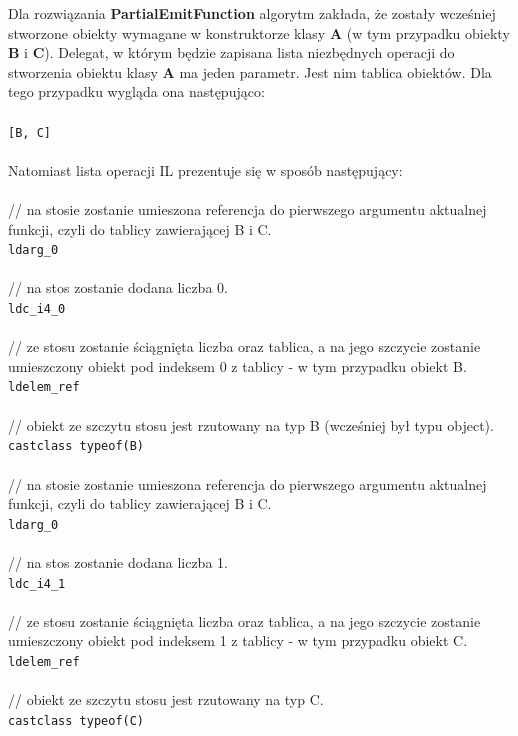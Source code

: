 \documentclass[12pt]{article}
\begin{document}
Dla rozwiązania \textbf{PartialEmitFunction} algorytm zakłada, że zostały wcześniej stworzone obiekty wymagane w konstruktorze klasy \textbf{A} (w tym przypadku obiekty \textbf{B} i \textbf{C}). Delegat, w którym będzie zapisana lista niezbędnych operacji do stworzenia obiektu klasy \textbf{A} ma jeden parametr. Jest nim tablica obiektów. Dla tego przypadku wygląda ona następująco:\\
\\
\texttt{[B, C]}\\
\\
Natomiast lista operacji IL prezentuje się w sposób następujący: \\
\\
// na stosie zostanie umieszona referencja do pierwszego argumentu aktualnej funkcji, czyli do tablicy zawierającej B i C.\\
\texttt{ldarg\_0}\\
\\
// na stos zostanie dodana liczba 0.\\
\texttt{ldc\_i4\_0}\\
\\
// ze stosu zostanie ściągnięta liczba oraz tablica, a na jego szczycie zostanie umieszczony obiekt pod indeksem 0 z tablicy - w tym przypadku obiekt B.\\
\texttt{ldelem\_ref}\\
\\
// obiekt ze szczytu stosu jest rzutowany na typ B (wcześniej był typu object).\\
\texttt{castclass typeof(B)}\\
\\
// na stosie zostanie umieszona referencja do pierwszego argumentu aktualnej funkcji, czyli do tablicy zawierającej B i C.\\
\texttt{ldarg\_0}\\
\\
// na stos zostanie dodana liczba 1.\\
\texttt{ldc\_i4\_1}\\
\\
// ze stosu zostanie ściągnięta liczba oraz tablica, a na jego szczycie zostanie umieszczony obiekt pod indeksem 1 z tablicy - w tym przypadku obiekt C.\\
\texttt{ldelem\_ref}\\
\\
// obiekt ze szczytu stosu jest rzutowany na typ C.\\
\texttt{castclass typeof(C)}\\
\end{document}
